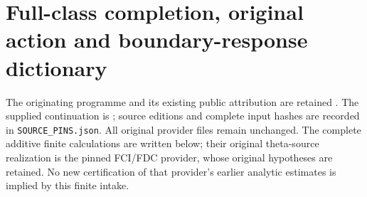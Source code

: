 \documentclass[11pt,a4paper]{article}
\begin{document}



\endgroup

\clearpage
\begingroup
\def\im{\operatorname{im}}
\def\diag{\operatorname{diag}}

\setcounter{equation}{0}
\renewcommand{\theequation}{A02NC.\arabic{equation}}
\section*{Full-class completion, original action and boundary-response dictionary}


\begin{abstract}
The actual DNE numerator section has a residue-dual description that omits
nonzero components of every retained simple eigenclass. We construct its
full low, conductor and native completion through every original minor,
calculate its metric and action with all cross terms, and carry the
complete class through the original arithmetic realization. The complete
centered action has an exact rank-two boundary formula at every original
cutoff. Its two boundary rows give precisely the original EC response
ratios, including their signs and both directed leakages. The parity of
the full physical source evaluates the mixed boundary Gram entry exactly
and identifies the product of its two observation amplifications. The
proof retains the original full root polynomial, measure, minimum,
conductor and projection. Absolute determinant allocations and individual
projected arithmetic signs are not evaluated by these finite identities.
\end{abstract}
The originating programme and its existing public attribution are
retained \cite{a02nc:human:globalization2026,a02nc:human:splitzero2026}.
The supplied continuation is \cite{a02nc:prog:arrival02}; source editions and
complete input hashes are recorded in \texttt{SOURCE\_PINS.json}.
All original provider files remain unchanged. The complete additive
finite calculations are written below; their original theta-source
realization is the pinned FCI/FDC provider, whose original hypotheses
are retained. No new certification of that provider's earlier analytic
estimates is implied by this finite intake.
\end{document}
